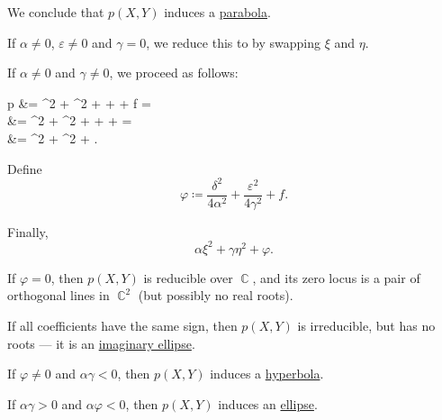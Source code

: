 \begin{algorithm}
\begin{thmenum}
    We conclude that \( p(X, Y) \) induces a \hyperref[def:parabola]{parabola}.

     If \( \alpha \neq 0 \), \( \varepsilon \neq 0 \) and \( \gamma = 0 \), we reduce this to  by swapping \( \xi \) and \( \eta \).

     If \( \alpha \neq 0 \) and \( \gamma \neq 0 \), we proceed as follows:
    \begin{balign*}
      p\parens*{ \xi - \frac \delta {2 \alpha}, \eta - \frac \varepsilon {2 \gamma} }
      &=
      \alpha \parens*{ \xi - \frac \delta {2 \alpha} }^2 + \gamma \parens*{ \eta - \frac \varepsilon {2 \gamma} }^2 + \delta \parens*{ \xi - \frac \delta {2 \alpha} } + \varepsilon \parens*{ \eta - \frac \varepsilon {2 \gamma} } + f
      = \\ &=
      \alpha \xi^2 + \gamma \eta^2 + \parens[\Big]{ 2 \alpha \cdot \frac {-\delta} {2 \alpha} + \delta } \xi + \parens[\Big]{ 2 \gamma \cdot \frac {-\varepsilon} {2 \gamma} + \varepsilon } \eta + 
      = \\ &=
      \alpha \xi^2 + \gamma \eta^2 + .
    \end{balign*}

    Define
    \begin{equation*}
      \varphi \coloneqq \frac {\delta^2} {4 \alpha^2} + \frac {\varepsilon^2} {4 \gamma^2} + f.
    \end{equation*}

    Finally,
    \begin{equation*}
      \alpha \xi^2 + \gamma \eta^2 + \varphi.
    \end{equation*}

    \begin{thmenum}
       If \( \varphi = 0 \), then \( p(X, Y) \) is reducible over \( \BbbC \), and its zero locus is a pair of orthogonal lines in \( \BbbC^2 \) (but possibly no real roots).

       If all coefficients have the same sign, then \( p(X, Y) \) is irreducible, but has no roots --- it is an \hyperref[ex:imaginary_ellipse]{imaginary ellipse}.

       If \( \varphi \neq 0 \) and \( \alpha \gamma < 0 \), then \( p(X, Y) \) induces a \hyperref[def:hyperbola]{hyperbola}.

       If \( \alpha \gamma > 0 \) and \( \alpha \varphi < 0 \), then \( p(X, Y) \) induces an \hyperref[def:ellipse]{ellipse}.
    \end{thmenum}
  \end{thmenum}
\end{algorithm}
